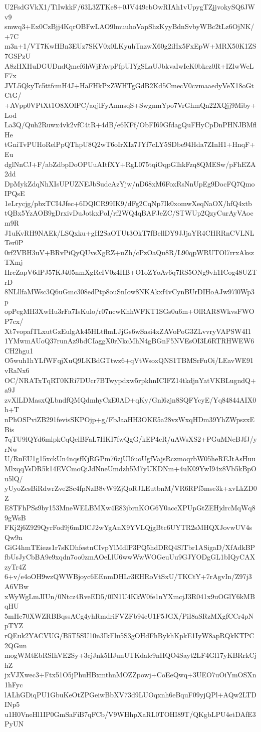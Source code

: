 U2FsdGVkX1/TiIwkkF/63L3ZTKe8+0JV449cbOwRIAh1vUpygTZjjvokySQ6JWv9
smwq3+Ex0CzBjj4KqrOBFwLAO9lmuuhoVapShzKyyBdnSvbyWBc2tLz6OjNK/+7C
m3n+1/VT7KwHBn3EUz7SKV0x0LKyuhTnzwX60g2iHx5FxEpW+MRX50K1ZS7GSPzU
A8zHXHuDGUDndQmef6hWjFAvpPfpUIYgSLaUJbkvaIwIeK0bkez0R+IZlwWeLF7x
JVL5QkyTc5ttfcmH4J+HaFHkPxZWHTgGdB2Kd5CmecV0cvmaaedyVeX18oGtCtG/
+AVpp0VPtXt1O8XOlPC/aqjlFyAmnsqS+SwgnmYpo7VrGhmQn22XQjj9Miby+Lod
La3Q/Quh2Ruwx4vk2vfC4tR+4dB/e6KFf/ObFI69GfdagQuFHyCpDnPHNJBMflHe
tGniTvPUHoRelPpQThpU8Q2wT6oIrXIz7JYf7cLY5SDbe94Hda7ZInH1+HnqF+Eu
dglNnCJ+F/abZdbpDoOPUuAItfXY+RgL075tqiOqpGlhkFzq8QMESw/pFhEZA2dd
DpMykZdqNhXIsUPUZNEJbSudcAzYjw/nD68xM6FoxRsNnUpEg9DocFQ7QmoIPQsE
1eLrycjg/pbxTCI4Jfec+6DQlCR99IK9/dFg2CqNp7Ik0xomwXeqNaOX/hfQ4xtb
tQBx5YzAOB9gDrxivDuJotkxPoI/rf2WQ4qBAFJeZC/STWUp2QzyCurAyVAocm9R
J1uKvRH9NAEk/LSQxku+gH2SaOTUt3OkT7fBellDY9JJjaYR4CHRRnCVLNLTer0P
0rf2VBH3uV+BRvPiQyQUvsXgRZ+uZh/cPzOaQu8R/L90qpWRUTOl7rrxAkszTXmj
HrcZapV6dPJ57KJ405nmXgRcIV0z4HB+O1oZYoAv6q7RS5ONg9vh1ICog48UZTrD
8NLllfaMWsc3Q6uGmc308edPtp8ouSnIow8NKAkxf4vCynBUrDIHoAJw97l0Wp3p
opPegMH3XwHu3rFa7IsKulo/r07ncwKhhWFKT1SGs0u6m+OlRAR8WkvsFWOP7cx/
Xt7vopafTLxutGzEulgAk45HLtflmLJjGs6wSasi4xZAVoPoG3ZLvvryVAPSW4I1
1YMwmAUoQ37runAz9bdCIaggX0rNkcMhN4gBGnF5NVEsOI3L6RTRHWEW6CH2hgu1
O5wuh1hYLfWFqjXuQ9LKBdGTtwz6+qVtWsoxQNS1TBMSrFuOi/LEavWE91vRaNx6
OC/NRATxTqRT0KRi7DUcr7BTwypdxw5rpkhnICIFZ14tkdjnYatVKBLugndQ+a9J
zvXlLDMasxQLbndfQMQdmhyCzE0AD+qKy/Gnl6zjn8SQFYcyE/Yq84844AIX0h+T
nPhOSPviZB291fevisSKPOjp+g/FbJaaHH3OKE5a28vzWxqHDm39YhZWpszxEBis
7qTU9lQYd6mlpkCqQelBFaL7HKI7fwQgG/kEP4cR/uAWsXS2+PGuMNeBJfJ/yrNw
U/RuEU1g15xckUn4nqsfKjRGPm76zjUI6uoUgfVajsRczmoqrbW05heREJtAsHuu
MlxqqVsDR5k14EVCmoQiJdNneUmdzh5M7yUKDNm+4uK09YwI94x8Vb5kBpOu5lQ/
yUyoZcsBiRdwrZve2Sc4fpNzB8vW9ZjQoRJLEutbnM/VR6RPf5mse3k+xvLkZD0Z
E8TFhPSs9by153MneWELBMXw4E83jbrnKOG6Y0accXPUpGtZEHjdrcMqWq89gWsB
FKj2j6Z929QyrFod9j6mDlCJ2wYgAnX9YVLQjgBtc6UYTR2sMHQXJovwUV4sQw9n
GiG4hmTEiezs1r7sKDhfestnCIvpYlMdlP3PQ5hdDRQ4SlTbr1ASigaD/XfAdkBP
fbUsJyCbBA9e9xqdn7oo0zmAOeLlU6wwWwWOGeuUu9GJYODgGL1bIQyCAXzyTr4Z
6+v/e4oOH9wzQWWBjoyc6EEnmDHLr3EHRoVtSxU/TKCtY+7rAgvIn/Z97j3A6VBw
xWyWgLmJIUn/0Ntcz4RveED5/0lN1U4KkW0fe1nYXmcjJ3R041x9uOGlY6kMBqHU
5mHc70XWZRBBqssACg4yhRmdriFVZFb94eU1F5JGX/PiI8aSRzMXgfCCr4pNpTYZ
rQEuk2YACVUG/B5T5SU10n3IkFlu5S3gOHdFhBykhKpkE1IyW8apRQkKTPC2QGun
mogWMtEbRSIhVE2Sy+3cjJnk5HJunUTKdalc9nHQO4Sayt2LF4Gl17yKBRrkCjhZ
jxVJXwec3+Ftx51O5jPhuHBxmthnMOZZpowj+CoEeQwq+3UEO7uOiYmOSXn1hFyc
lALhGDiqPU1GbuKeOtZPGeiwBbXV73d9LUOqxnh6eBquF09yjQPl+AQw2LTDINp5
u1H0VneHl1IP0GmSaFiB7qFCb/V9WHhpXaRL0TOHI89T/QKgbLPU4etDAfE3PyUN

